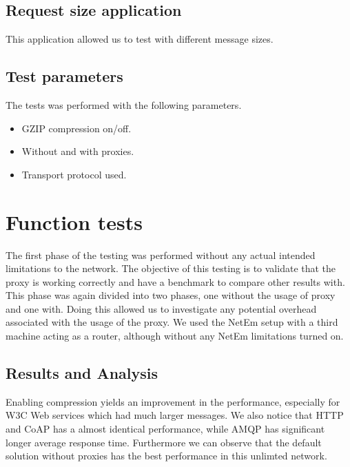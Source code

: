\subsection{Request size application}

This application allowed us to test with different message sizes.

\subsection{Test parameters}

The tests was performed with the following parameters.

\begin{itemize}
	\item GZIP compression on/off.
	\item Without and with proxies.
    \item Transport protocol used.
\end{itemize}


\section{Function tests}

The first phase of the testing was performed without any actual intended
limitations to the network. The objective of this testing is to validate that
the proxy is working correctly and have a benchmark to compare other results
with. This phase was again divided into two phases, one without the usage of
proxy and one with. Doing this allowed us to investigate any potential
overhead associated with the usage of the proxy. We used the NetEm setup with
a third machine acting as a router, although without any NetEm limitations
turned on.


\subsection{Results and Analysis}

Enabling compression yields an improvement in the performance, especially for
W3C Web services which had much larger messages. We also notice that HTTP and
CoAP has a almost identical performance, while AMQP has significant longer
average response time. Furthermore we can observe that the default solution
without proxies has the best performance in this unlimted network.

